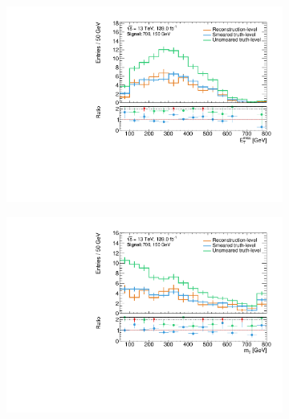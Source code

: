   \begin{figure}
	\centering
	\begin{subfigure}[b]{0.45\linewidth}
		\centering\includegraphics[width=\textwidth]{20210324/700_150/met_C1N2_Wh_hbb_700p0_150p0_smeared.pdf}
	\end{subfigure}\hfill
	\begin{subfigure}[b]{0.45\linewidth}
		\centering\includegraphics[width=\textwidth]{20210324/700_150/mt_C1N2_Wh_hbb_700p0_150p0_smeared.pdf}
	\end{subfigure}\hfill
	\begin{subfigure}[b]{0.45\linewidth}

\end{subfigure}
\end{figure}
